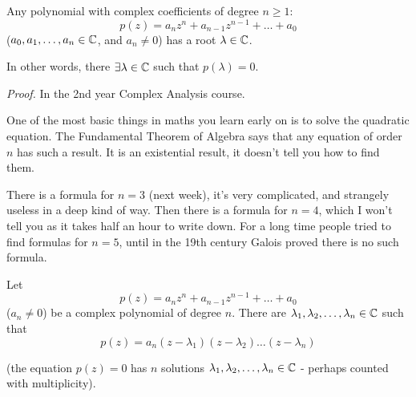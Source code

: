 \documentclass[10pt]{scrartcl}
\begin{document}



\vspace*{10pt}
\begin{theorem}
Any polynomial with complex coefficients of degree $n \geq 1$: 
\[p(z) = a_n z^n + a_{n-1}z^{n-1} + \dots + a_0\]
($a_0,a_1,\dots,a_n \in\mathbb{C}$, and $a_n \neq 0$) has a root $\lambda \in\mathbb{C}$. 
\end{theorem}

In other words, there $\exists \lambda \in\mathbb{C}$ such that $p(\lambda) = 0$.

\emph{Proof.} In the 2nd year Complex Analysis course. 

One of the most basic things in maths you learn early on is to solve the quadratic equation. The Fundamental Theorem of Algebra says that any equation of order $n$ has such a result. It is an existential result, it doesn't tell you how to find them.

 There is a formula for $n =3$ (next week), it's very complicated, and strangely useless in a deep kind of way. Then there is a formula for $n=4$, which I won't tell you as it takes half an hour to write down. For a long time people tried to find formulas for $n=5$, until in the 19th century Galois proved there is no such formula.


\begin{corollary}
Let 
\[p(z) = a_n z^n + a_{n-1}z^{n-1} + \dots + a_0\]
($a_n \neq 0$) be a complex polynomial of degree $n$. There are $\lambda_1,\lambda_2,\dots,\lambda_n \in\mathbb{C}$ such that 
\[p(z) = a_n(z-\lambda_1)(z-\lambda_2)\dots(z-\lambda_n)\]
\end{corollary}

(the equation $p(z) = 0$ has $n$ solutions $\lambda_1,\lambda_2,\dots,\lambda_n \in\mathbb{C}$  - perhaps counted with multiplicity). 
\end{document}
